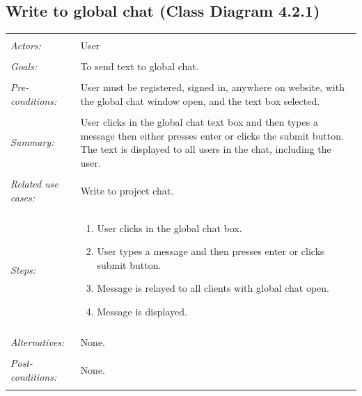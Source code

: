 \documentclass[11pt]{report}
\begin{document}
\subsection{Write to global chat (Class Diagram 4.2.1)}
\begin{tabular}{ p{2cm} p{12cm} }
 \hline
 \\
 \textit{Actors:} & User \\ 
 \\
 \textit{Goals:} & To send text to global chat. \\
 \\
 \textit{Pre-conditions:} & User must be registered, signed in, anywhere on website, with the global chat window open, and the text box selected.  \\
 \\
 \textit{Summary:} & User clicks in the global chat text box and then types a message then either presses enter or clicks the submit button. The text is displayed to all users in the chat, including the user. \\ 
 \\
 \textit{Related use cases:} & Write to project chat. \\ 
 \\
 \textit{Steps:} & \begin{enumerate}
  \item User clicks in the global chat box.
  \item User types a message and then presses enter or clicks submit button.
  \item Message is relayed to all clients with global chat open.
  \item Message is displayed.
 \end{enumerate} \\
 \\
 \textit{Alternatives:} & None. \\
 \\
 \textit{Post-conditions:} & None. \\
 \\
\hline
\end{tabular}
\end{document}
